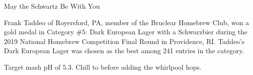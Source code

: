\documentclass[fontsize=9pt,oneside]{scrbook}
\begin{document}
\mainmatter


\begin{recipe}{May the Schwartz Be With You}

\begin{aboutblock}
Frank Taddeo of Royersford, PA, member of the Bruclear Homebrew Club, won a gold
medal in Category \#5: Dark European Lager with a Schwarzbier during the 2019
National Homebrew Competition Final Round in Providence, RI. Taddeo's Dark European
Lager was chosen as the best among 241 entries in the category. \sourceaha
\end{aboutblock}


\begin{methodandtiming}
 
\begin{mashsteps}
\end{mashsteps}

\begin{fermentationsteps}
\end{fermentationsteps}

\begin{directions}
Target mash pH of 5.3. Chill to  before adding the whirlpool hops.
\end{directions}

\end{methodandtiming}

\recipebreak

\begin{ingredientsblock}

\begin{malts}
\end{malts}

\begin{hops}
\end{hops}


\end{ingredientsblock}

\end{recipe}

\backmatter


\end{document}

